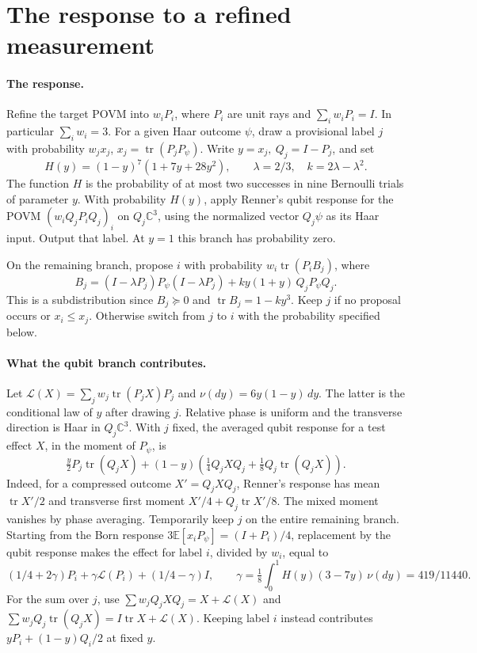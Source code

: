 \documentclass[10pt,a4paper]{article}
\newcommand{\tr}{\operatorname{tr}}
\newcommand{\C}{\mathbb C}
\newcommand{\E}{\mathbb E}
\begin{document}
\section{The response to a refined measurement}
\paragraph{The response.}
Refine the target POVM into \(w_iP_i\), where \(P_i\) are unit rays and
\(\sum_iw_iP_i=I\). In particular \(\sum_iw_i=3\). For a given Haar outcome
\(\psi\), draw a provisional label \(j\) with probability \(w_j x_j\),
\(x_j=\tr(P_jP_\psi)\). Write \(y=x_j,\ Q_j=I-P_j\), and set
\[
 H(y)=(1-y)^7(1+7y+28y^2),\qquad \lambda=2/3,\quad k=2\lambda-\lambda^2.
\]
The function \(H\) is the probability of at most two successes in nine
Bernoulli trials of parameter \(y\). With probability \(H(y)\), apply
Renner's qubit response for the POVM \((w_iQ_jP_iQ_j)_i\) on \(Q_j\C^3\),
using the normalized vector \(Q_j\psi\) as its Haar input. Output that
label. At \(y=1\) this branch has probability zero.

On the remaining branch, propose \(i\) with probability \(w_i\tr(P_iB_j)\), where
\[
 B_j=(I-\lambda P_j)P_\psi(I-\lambda P_j)
       +k y(1+y)\,Q_jP_\psi Q_j .
\]
This is a subdistribution since \(B_j\succeq0\) and \(\tr B_j=1-ky^3\).
Keep \(j\) if no proposal occurs or \(x_i\le x_j\). Otherwise switch from
\(j\) to \(i\) with the probability specified below.

\paragraph{What the qubit branch contributes.}
Let \(\mathcal L(X)=\sum_j w_j\tr(P_jX)P_j\) and
\(\nu(dy)=6y(1-y)\,dy\). The latter is the conditional law of \(y\) after
drawing \(j\). Relative phase is uniform and the transverse direction is
Haar in \(Q_j\C^3\). With \(j\) fixed, the averaged qubit response for a
test effect \(X\), in the moment of \(P_\psi\), is
\[
 \tfrac y2P_j\tr(Q_jX)+(1-y)\left(\tfrac14 Q_jXQ_j
                         +\tfrac18 Q_j\tr(Q_jX)\right).
\]
Indeed, for a compressed outcome \(X'=Q_jXQ_j\), Renner's response has mean \(\tr X'/2\) and transverse first moment \(X'/4+Q_j\tr X'/8\). The mixed moment vanishes by phase averaging.
Temporarily keep \(j\) on the entire remaining branch. Starting from the
Born response \(3\E[x_i P_\psi]=(I+P_i)/4\), replacement by the qubit response
makes the effect for label \(i\), divided by \(w_i\), equal to
\[
 (1/4+2\gamma)P_i+\gamma\mathcal L(P_i)+(1/4-\gamma)I,\qquad
 \gamma=\tfrac18\int_0^1 H(y)(3-7y)\,\nu(dy)=419/11440.
\]
For the sum over \(j\), use \(\sum w_jQ_jXQ_j=X+\mathcal L(X)\) and
\(\sum w_jQ_j\tr(Q_jX)=I\tr X+\mathcal L(X)\). Keeping label \(i\) instead
contributes \(yP_i+(1-y)Q_i/2\) at fixed \(y\).
\end{document}
